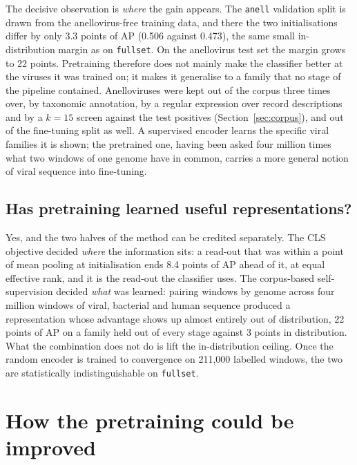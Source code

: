 \documentclass[10pt,twocolumn,a4paper]{article}
\begin{document}
The decisive observation is \emph{where} the gain appears. The \texttt{anell}
validation split is drawn from the anellovirus-free training data, and there the
two initialisations differ by only 3.3 points of AP (0.506 against 0.473), the
same small in-distribution margin as on \texttt{fullset}. On the anellovirus test
set the margin grows to 22 points. Pretraining therefore does not mainly make the
classifier better at the viruses it was trained on; it makes it generalise to a
family that no stage of the pipeline contained. Anelloviruses were kept out of
the corpus three times over, by taxonomic annotation, by a regular expression
over record descriptions and by a $k=15$ screen against the test positives
(Section~\ref{sec:corpus}), and out of the fine-tuning split as well. A
supervised encoder learns the specific viral families it is shown; the pretrained
one, having been asked four million times what two windows of one genome have in
common, carries a more general notion of viral sequence into fine-tuning.

\subsection{Has pretraining learned useful representations?}

Yes, and the two halves of the method can be credited separately. The CLS
objective decided \emph{where} the information sits: a read-out that was within a
point of mean pooling at initialisation ends 8.4 points of AP ahead of it, at
equal effective rank, and it is the read-out the classifier uses.
The corpus-based self-supervision decided \emph{what} was learned: pairing
windows by genome across four million windows of viral, bacterial and human
sequence produced a representation whose advantage shows up almost entirely out
of distribution, 22 points of AP on a family held out of every stage against 3
points in distribution. What the combination does not do is lift the
in-distribution ceiling. Once the random encoder is trained to convergence on
211{,}000 labelled windows, the two are statistically indistinguishable on
\texttt{fullset}.

\section{How the pretraining could be improved}\label{sec:improve}
\end{document}
